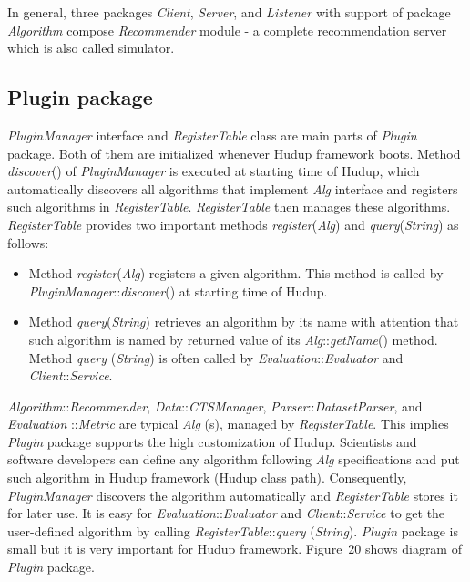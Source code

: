 \documentclass[a4paper]{llncs}
\begin{document}
In general, three packages \textit{Client}, \textit{Server}, and \textit{Listener} with support of package \textit{Algorithm} compose \textit{Recommender} module - a complete recommendation server which is also called simulator.

\subsection{Plugin package}
\label{subsec:plugin-package}
\textit{PluginManager} interface and \textit{RegisterTable} class are main parts of \textit{Plugin} package. Both of them are initialized whenever Hudup framework boots. Method \textit{discover}() of \textit{PluginManager} is executed at starting time of Hudup, which automatically discovers all algorithms that implement \textit{Alg} interface and registers such algorithms in \textit{RegisterTable}. \textit{RegisterTable} then manages these algorithms. \textit{RegisterTable} provides two important methods \textit{register}(\textit{Alg}) and \textit{query}(\textit{String}) as follows:
\begin{itemize}
\item Method \textit{register}(\textit{Alg}) registers a given algorithm. This method is called by \textit{PluginManager}::\textit{discover}() at starting time of Hudup.
\item Method \textit{query}(\textit{String}) retrieves an algorithm by its name with attention that such algorithm is named by returned value of its \textit{Alg}::\textit{getName}() method. Method \textit{query} (\textit{String}) is often called by \textit{Evaluation}::\textit{Evaluator} and \textit{Client}::\textit{Service}.
\end{itemize}
\textit{Algorithm}::\textit{Recommender}, \textit{Data}::\textit{CTSManager}, \textit{Parser}::\textit{DatasetParser}, and \textit{Evaluation} ::\textit{Metric} are typical \textit{Alg} (s), managed by \textit{RegisterTable}. This implies \textit{Plugin} package supports the high customization of Hudup. Scientists and software developers can define any algorithm following \textit{Alg} specifications and put such algorithm in Hudup framework (Hudup class path). Consequently, \textit{PluginManager} discovers the algorithm automatically and \textit{RegisterTable} stores it for later use. It is easy for \textit{Evaluation}::\textit{Evaluator} and \textit{Client}::\textit{Service} to get the user-defined algorithm by calling \textit{RegisterTable}::\textit{query} (\textit{String}). \textit{Plugin} package is small but it is very important for Hudup framework. Figure~20 shows diagram of \textit{Plugin} package.
\end{document}
